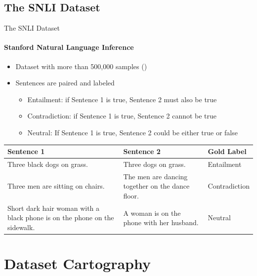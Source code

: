 \documentclass[
	11pt,
]{beamer}
\begin{document}
\subsection{The SNLI Dataset}
\begin{frame}{The SNLI Dataset}
	\framesubtitle{Stanford Natural Language Inference}
	\begin{itemize}
		\item Dataset with more than 500,000 samples (\cite{snli:emnlp2015})
		\item Sentences are paired and labeled
		      \begin{itemize}
			      \item Entailment: if Sentence 1 is true, Sentence 2 must also be true
			      \item Contradiction: if Sentence 1 is true, Sentence 2 cannot be true
			      \item Neutral: If Sentence 1 is true, Sentence 2 could be either true or false
		      \end{itemize}
	\end{itemize}
	\vspace{.2cm}
	\fontsize{8pt}{10pt}\selectfont
	\begin{tabular}{| M{4.1cm} | M{4.1cm}| M{2cm} |}
		\hline
		Sentence 1                                                                & Sentence 2                                       & Gold Label    \\ \hline
		Three black dogs on grass.                                                & Three dogs on grass.                             & Entailment    \\ \hline
		Three men are sitting on chairs.                                          & The men are dancing together on the dance floor. & Contradiction \\ \hline
		Short dark hair woman with a black phone is on the phone on the sidewalk. & A woman is on the phone with her husband.        & Neutral       \\
		\hline
	\end{tabular}
\end{frame}



\section{Dataset Cartography}
\end{document}
